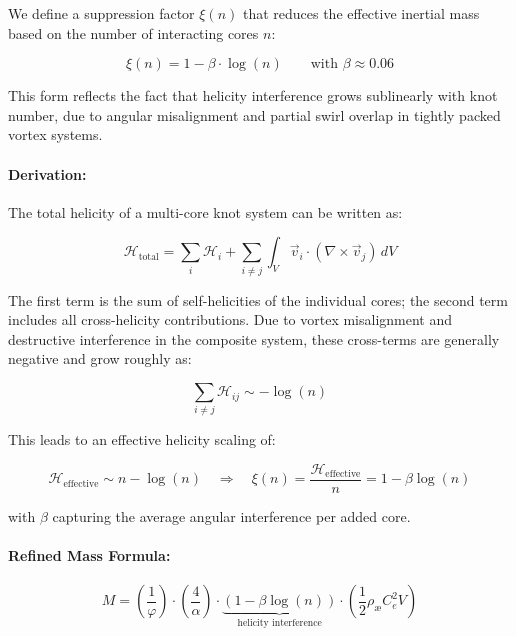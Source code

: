 \documentclass[12pt]{article}
\begin{document}
We define a suppression factor \( \xi(n) \) that reduces the effective inertial mass based on the number of interacting cores \( n \):

\begin{equation}
\boxed{
\xi(n) = 1 - \beta \cdot \log(n)
}
\qquad \text{with } \beta \approx 0.06
\end{equation}

This form reflects the fact that helicity interference grows sublinearly with knot number, due to angular misalignment and partial swirl overlap in tightly packed vortex systems.

\paragraph{Derivation:}
The total helicity of a multi-core knot system can be written as:

\begin{equation}
\mathcal{H}_{\text{total}} = \sum_i \mathcal{H}_i + \sum_{i \neq j} \int_V \vec{v}_i \cdot (\nabla \times \vec{v}_j) \, dV
\end{equation}

The first term is the sum of self-helicities of the individual cores; the second term includes all cross-helicity contributions. Due to vortex misalignment and destructive interference in the composite system, these cross-terms are generally negative and grow roughly as:

\[
\sum_{i \neq j} \mathcal{H}_{ij} \sim -\log(n)
\]

This leads to an effective helicity scaling of:

\[
\mathcal{H}_{\text{effective}} \sim n - \log(n)
\quad \Rightarrow \quad
\xi(n) = \frac{\mathcal{H}_{\text{effective}}}{n} = 1 - \beta \log(n)
\]

with \( \beta \) capturing the average angular interference per added core.

\paragraph{Refined Mass Formula:}

\begin{equation}
\boxed{
M = \left( \frac{1}{\varphi} \right) \cdot \left( \frac{4}{\alpha} \right) \cdot \underbrace{\left(1 - \beta \log(n)\right)}_{\text{helicity interference}} \cdot \left( \frac{1}{2} \rho_\text{\ae} C_e^2 V \right)
}
\end{equation}
\end{document}
